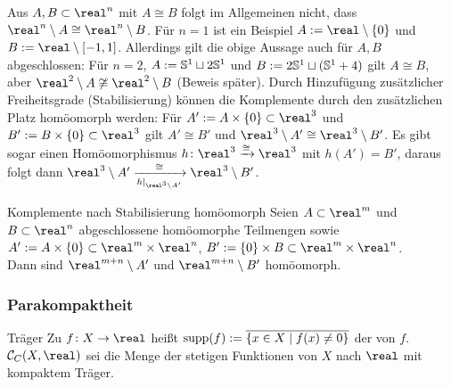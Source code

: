 \linie

\begin{Bem}
    Aus $A, B \subset \real^n$ mit $A \cong B$ folgt im Allgemeinen nicht,
    dass $\real^n \setminus A \cong \real^n \setminus B$.
    Für $n = 1$ ist ein Beispiel $A := \real \setminus \{0\}$ und
    $B := \real \setminus [-1, 1]$.
    Allerdings gilt die obige Aussage auch für $A, B$ abgeschlossen:
    Für $n = 2$, $A := \mathbb{S}^1 \sqcup 2\mathbb{S}^1$ und
    $B := 2\mathbb{S}^1 \sqcup (\mathbb{S}^1 + 4)$ gilt
    $A \cong B$, aber $\real^2 \setminus A \not\cong \real^2 \setminus B$
    (Beweis später).
    Durch Hinzufügung zusätzlicher Freiheitsgrade (Stabilisierung)
    können die Komplemente durch den zusätzlichen Platz homöomorph werden:
    Für $A' := A \times \{0\} \subset \real^3$ und
    $B' := B \times \{0\} \subset \real^3$ gilt $A' \cong B'$ und
    $\real^3 \setminus A' \cong \real^3 \setminus B'$.
    Es gibt sogar einen Homöomorphismus $h\colon \real^3 \homoe \real^3$
    mit $h(A') = B'$, daraus folgt dann
    $\real^3 \setminus A' \xrightarrow[h|_{\real^3 \setminus A'}]{\cong}
    \real^3 \setminus B'$.
\end{Bem}

\begin{Satz}{Komplemente nach Stabilisierung homöomorph}
    Seien $A \subset \real^m$ und $B \subset \real^n$ abgeschlossene
    homöomorphe Teilmengen sowie
    $A' := A \times \{0\} \subset \real^m \times \real^n$,
    $B' := \{0\} \times B \subset \real^m \times \real^n$. \\
    Dann sind $\real^{m+n} \setminus A'$ und $\real^{m+n} \setminus B'$
    homöomorph.
\end{Satz}

\subsubsection{%
    Parakompaktheit%
}

\begin{Def}{Träger}
    Zu $f\colon X \rightarrow \real$ heißt
    $\operatorname{supp}(f) := \overline{\{x \in X \;|\; f(x) \not= 0\}}$ der
     von $f$. \\
    $\C_C(X, \real)$ sei die Menge der stetigen Funktionen von $X$ nach $\real$
    mit kompaktem Träger.
\end{Def}

